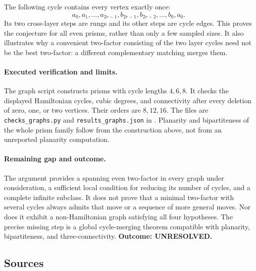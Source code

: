 \documentclass[11pt,a4paper]{article}
\begin{document}
The following cycle contains every vertex exactly once:
\[
 a_0,a_1,\ldots,a_{2r-1},b_{2r-1},b_{2r-2},\ldots,b_0,a_0.
\]
Its two cross-layer steps are rungs and its other steps are cycle
edges. This proves the conjecture for all even prisms, rather than
only a few sampled sizes. It also illustrates why a convenient
two-factor consisting of the two layer cycles need not be the best
two-factor: a different complementary matching merges them.

\paragraph{Executed verification and limits.}
The graph script constructs prisms with cycle lengths $4,6,8$. It
checks the displayed Hamiltonian cycles, cubic degrees, and connectivity
after every deletion of zero, one, or two vertices. Their orders are
$8,12,16$. The files are \texttt{checks\_graphs.py} and
\texttt{results\_graphs.json} in
.
Planarity and bipartiteness of the whole prism family follow from the
construction above, not from an unreported planarity computation.

\paragraph{Remaining gap and outcome.}
The argument provides a spanning even two-factor in every graph under
consideration, a sufficient local condition for reducing its number of
cycles, and a complete infinite subclass. It does not prove that a
minimal two-factor with several cycles always admits that move or a
sequence of more general moves. Nor does it exhibit a non-Hamiltonian
graph satisfying all four hypotheses. The precise missing step is a
global cycle-merging theorem compatible with planarity, bipartiteness,
and three-connectivity. \textbf{Outcome: UNRESOLVED.}

\subsection{Sources}
\end{document}
